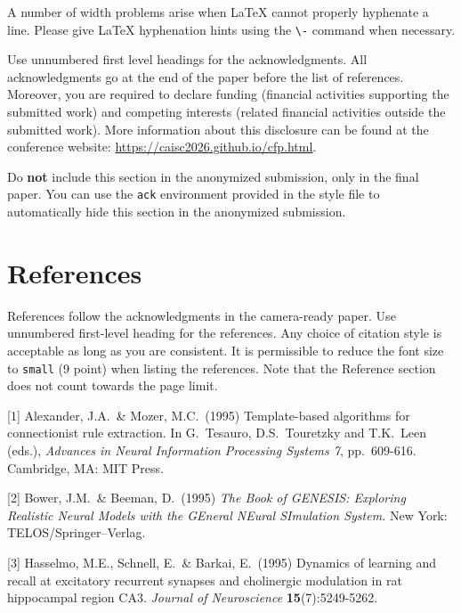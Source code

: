 \documentclass{article}
\begin{document}
A number of width problems arise when \LaTeX{} cannot properly hyphenate a line. Please give LaTeX hyphenation hints using the \verb+\-+ command when necessary.

\begin{ack}
Use unnumbered first level headings for the acknowledgments. All acknowledgments go at the end of the paper before the list of references. Moreover, you are required to declare funding (financial activities supporting the submitted work) and competing interests (related financial activities outside the submitted work). More information about this disclosure can be found at the conference website: \url{https://caisc2026.github.io/cfp.html}.

Do {\bf not} include this section in the anonymized submission, only in the final paper. You can use the \texttt{ack} environment provided in the style file to automatically hide this section in the anonymized submission.
\end{ack}

\section*{References}

References follow the acknowledgments in the camera-ready paper. Use unnumbered first-level heading for the references. Any choice of citation style is acceptable as long as you are consistent. It is permissible to reduce the font size to \verb+small+ (9 point) when listing the references. Note that the Reference section does not count towards the page limit. 
\medskip

{
\small

[1] Alexander, J.A.\ \& Mozer, M.C.\ (1995) Template-based algorithms for connectionist rule extraction. In G.\ Tesauro, D.S.\ Touretzky and T.K.\ Leen (eds.), {\it Advances in Neural Information Processing Systems 7}, pp.\ 609-616. Cambridge, MA: MIT Press.


[2] Bower, J.M.\ \& Beeman, D.\ (1995) {\it The Book of GENESIS: Exploring Realistic Neural Models with the GEneral NEural SImulation System.}  New York: TELOS/Springer--Verlag.


[3] Hasselmo, M.E., Schnell, E.\ \& Barkai, E.\ (1995) Dynamics of learning and recall at excitatory recurrent synapses and cholinergic modulation in rat hippocampal region CA3. {\it Journal of Neuroscience} {\bf 15}(7):5249-5262.}

\appendix
\end{document}
